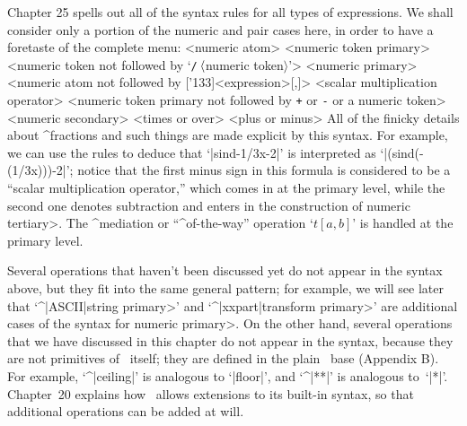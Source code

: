 {{{{\danger Chapter 25 spells out all of the syntax rules for all types of
expressions. We shall consider only a portion of the numeric and pair
cases here, in order to have a foretaste of the complete menu:
\def\\#1{\thinspace{\tt#1}\thinspace}
\beginsyntax
<numeric atom>
 \alt[normaldeviate]
<numeric token primary>
 \alt<numeric token not followed by %
  `{\tt/}$\thinspace\langle$numeric token$\rangle$'\thinspace>
<numeric primary>\is<numeric atom not followed by {[\char'133]<expression>[,]}>
 \is[sqrt]\alt[sind]\alt[cosd]\alt[mlog]\alt[mexp]
 \alt[floor]\alt[uniformdeviate]
<scalar multiplication operator>
 \alt<numeric token primary not followed by %
  {\tt+} or {\tt-} or a numeric token>
<numeric secondary>
<times or over>\is[*]
<plus or minus>\is[+]\is[++]
\endsyntax
All of the finicky details about ^{fractions} and such things are made
explicit by this syntax. For example, we can use the rules to deduce that
`|sind-1/3x-2|' is interpreted as `|(sind(-(1/3x)))-2|'; notice that the
first minus sign in this formula is considered to be a ``scalar multiplication
operator,'' which comes in at the primary level, while the second one denotes
subtraction and enters in the construction of \<numeric tertiary>. The
^{mediation} or ``^{of-the-way}'' operation `$t[a,b]$' is handled at the
primary level.

\danger Several operations that haven't been discussed yet do not appear
in the syntax above, but they fit into the same general pattern; for example,
we will see later that `^|ASCII|\<string primary>' and `^|xxpart|\<transform
primary>' are additional cases of the syntax for \<numeric primary>.
On the other hand, several operations that we have discussed in this chapter
do not appear in the syntax, because they are not primitives of \MF\ itself;
they are defined in the plain \MF\ base (Appendix B\null). For example,
`^|ceiling|' is analogous to `|floor|', and `^|**|' is analogous to~`|*|'.
Chapter~20 explains how \MF\ allows extensions to its built-in syntax,
so that additional operations can be added at will.

}}}}

